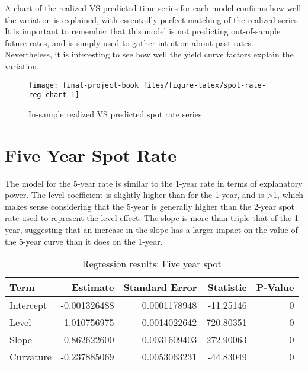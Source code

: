 \documentclass[openany]{book}
\theoremstyle{definition}
\theoremstyle{definition}
\theoremstyle{definition}
\theoremstyle{remark}
\begin{document}
A chart of the realized VS predicted time series for each model confirms
how well the variation is explained, with essentailly perfect matching
of the realized series. It is important to remember that this model is
not predicting out-of-sample future rates, and is simply used to gather
intuition about past rates. Nevertheless, it is interesting to see how
well the yield curve factors explain the variation.

\small

\begin{figure}[H]

{\centering \texttt{[image: final-project-book\_files/figure-latex/spot-rate-reg-chart-1]} 

}

\caption{In-sample realized VS predicted spot rate series}\label{fig:spot-rate-reg-chart}
\end{figure}

\normalsize

\hypertarget{five-year-spot-rate}{%
\section{Five Year Spot Rate}\label{five-year-spot-rate}}

The model for the 5-year rate is similar to the 1-year rate in terms of
explanatory power. The level coefficient is slightly higher than for the
1-year, and is \textgreater{}1, which makes sense considering that the
5-year is generally higher than the 2-year spot rate used to represent
the level effect. The slope is more than triple that of the 1-year,
suggesting that an increase in the slope has a larger impact on the
value of the 5-year curve than it does on the 1-year.

\small

\begin{table}[H]

\caption{\label{tab:five-year-reg}Regression results: Five year spot}
\centering
\begin{tabular}[t]{lrrrr}
\toprule
Term & Estimate & Standard Error & Statistic & P-Value\\
\midrule
Intercept & -0.001326488 & 0.0001178948 & -11.25146 & 0\\
Level & 1.010756975 & 0.0014022642 & 720.80351 & 0\\
Slope & 0.862622600 & 0.0031609403 & 272.90063 & 0\\
Curvature & -0.237885069 & 0.0053063231 & -44.83049 & 0\\
\bottomrule
\end{tabular}
\end{table}
\end{document}
